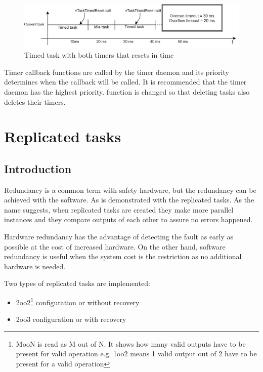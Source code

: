 \begin{figure}[H]

      \centering
      \includegraphics[width=\linewidth]{images/timed_example_reset.png}
      \caption{Timed task with both timers that resets in time}
      \label{fig:timed_example_reset}
    
\end{figure}

Timer callback functions are called by the timer daemon and its priority determines when the callback will be called. It is recommended that the timer daemon has the highest priority.  function is changed so that deleting tasks also deletes their timers. 

\section{Replicated tasks}

\subsection{Introduction}

Redundancy is a common term with safety hardware, but the redundancy can be achieved with the software. As is demonstrated with the replicated tasks. As the name suggests, when replicated tasks are created they make more parallel instances and they compare outputs of each other to assure no errors happened. 

Hardware redundancy has the advantage of detecting the fault as early as possible at the cost of increased hardware. On the other hand, software redundancy is useful when the system cost is the restriction as no additional hardware is needed. 

\noindent Two types of replicated tasks are implemented:
\begin{itemize}
    \item 2oo2\footnote{MooN is read as M out of N. It shows how many valid outputs have to be present for valid operation e.g. 1oo2 means 1 valid output out of 2 have to be present for a valid operation} configuration or without recovery
    \item 2oo3 configuration or with recovery
\end{itemize}

